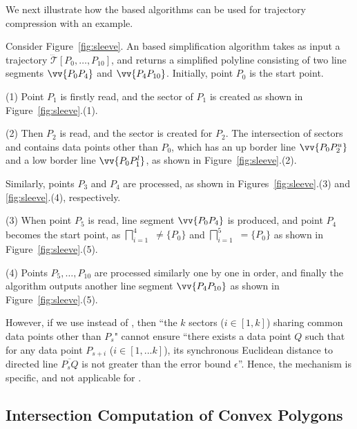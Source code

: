 We next illustrate how the \cia based algorithms can be used for trajectory compression with an example.

\begin{example}
\label{exm-alg-sleeve}
Consider Figure~\ref{fig:sleeve}. An \cia based simplification algorithm takes as input a trajectory $\dddot{\mathcal{T}}[P_0, \ldots, P_{10}]$, and returns a simplified polyline consisting of two line segments $\vv{P_0P_4}$ and  $\vv{P_4P_{10}}$. Initially, point $P_0$ is the start point.

\sstab(1) Point $P_1$ is firstly read, and the sector  of $P_1$ is created as shown in Figure~\ref{fig:sleeve}.(1).

\sstab(2) Then $P_2$ is read, and the sector   is created for $P_2$. The intersection of sectors  and   contains data points other than $P_0$,  which has an up border line $\vv{P_0P_2^u}$ and a low border line $\vv{P_0P_1^l}$, as shown in Figure~\ref{fig:sleeve}.(2).

Similarly, points $P_3$ and $P_4$ are processed, as shown in Figures~\ref{fig:sleeve}.(3) and \ref{fig:sleeve}.(4), respectively.

\sstab(3) When point $P_5$ is read,  line segment $\vv{P_0P_4}$ is produced, and point $P_4$ becomes the start point, as $\bigsqcap_{i=1}^{4}$ $\ne\{P_0\}$ and $\bigsqcap_{i=1}^{5}$ $=\{P_0\}$ as shown in Figure~\ref{fig:sleeve}.(5).


\sstab(4) Points $P_5, \ldots, P_{10}$ are processed similarly one by one in order, and finally the algorithm outputs another line segment $\vv{P_4P_{10}}$ as shown in Figure~\ref{fig:sleeve}.(5). \eop
\end{example}


However, if we use \sed instead of \ped, then  ``the $k$ sectors  ($i\in[1,k]$) sharing common data points other than $P_s$" cannot ensure ``there exists a data point $Q$ such that for any data point $P_{s+i}$ ($i \in [1, ... k]$), its synchronous Euclidean distance to directed line $\overline{P_sQ}$ is not greater than the error bound $\epsilon$''.
Hence, the \cia mechanism is \ped specific, and not applicable for \sed.







\subsection{Intersection Computation of Convex Polygons}
\label{subsec-cpi}

